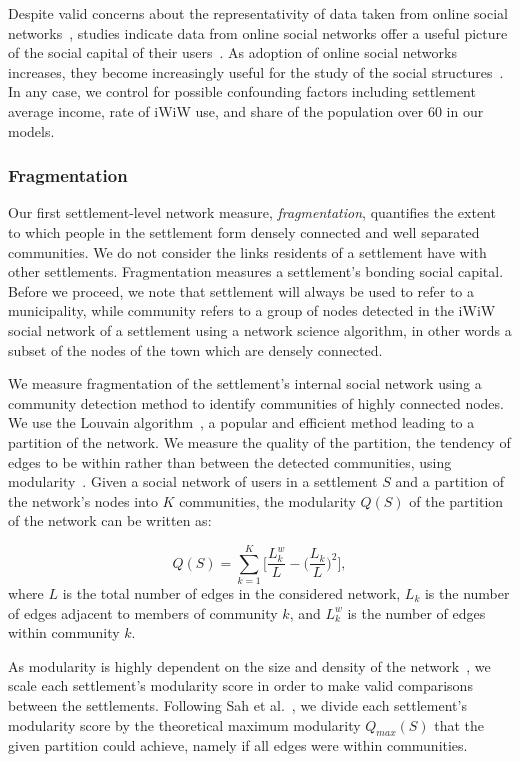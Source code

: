 Despite valid concerns about the representativity of data taken from online social networks~\cite{Torok2016big}, studies indicate data from online social networks offer a useful picture of the social capital of their users~\cite{williams2006and,brooks2014assessing}. As adoption of online social networks increases, they become increasingly useful for the study of the social structures~\cite{dunbar2015structure}. In any case, we control for possible confounding factors including settlement average income, rate of iWiW use, and share of the population over 60 in our models.

\subsubsection{Fragmentation}
Our first settlement-level network measure, \textit{fragmentation}, quantifies the extent to which people in the settlement form densely connected and well separated communities. We do not consider the links residents of a settlement have with other settlements. Fragmentation measures a settlement's bonding social capital. Before we proceed, we note that settlement will always be used to refer to a municipality, while community refers to a group of nodes detected in the iWiW social network of a settlement using a network science algorithm, in other words a subset of the nodes of the town which are densely connected.

We measure fragmentation of the settlement's internal social network using a community detection method to identify communities of highly connected nodes. We use the Louvain algorithm~\cite{blondel2008fast}, a popular and efficient method leading to a partition of the network. We measure the quality of the partition, the tendency of edges to be within rather than between the detected communities, using modularity~\cite{newman2006modularity}. Given a social network of users in a settlement $S$ and a partition of the network's nodes into $K$ communities, the modularity $Q(S)$ of the partition of the network can be written as:

$$Q(S) = \sum_{k=1}^{K} \Big[ \dfrac{L^{w}_{k}}{L} -\Big(\dfrac{L_{k}}{L}\Big)^{2} \Big],$$
where $L$ is the total number of edges in the considered network, $L_{k}$ is the number of edges adjacent to members of community $k$, and $L_{k}^{w}$ is the number of edges within community $k$. 

As modularity is highly dependent on the size and density of the network~\cite{Fortunato2009resolution}, we scale each settlement's modularity score in order to make valid comparisons between the settlements. Following Sah et al.~\cite{sah2017unraveling}, we divide each settlement's modularity score by the theoretical maximum modularity $Q_{max}(S)$ that the given partition could achieve, namely if all edges were within communities. 

